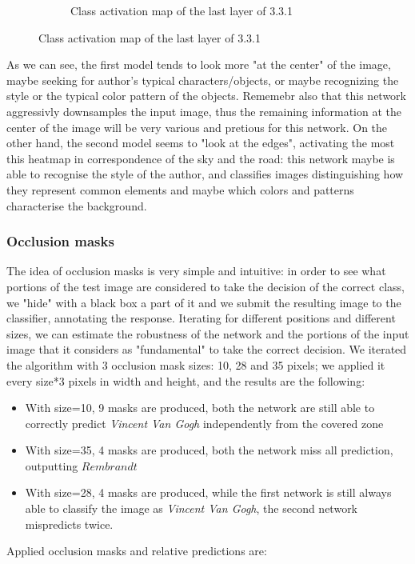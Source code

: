 \begin{figure}[H]
\begin{subfigure}{0.5\textwidth}
		\caption{Class activation map of the last layer of 3.3.1}
		\label{fig:il_heatmap}
	\end{subfigure}
\end{figure}

\noindent As we can see, the first model tends to look more "at the center" of the image, maybe seeking for author's typical characters/objects, or maybe recognizing the style or the typical color pattern of the objects. Rememebr also that this network aggressivly downsamples the input image, thus the remaining information at the center of the image will be very various and pretious for this network. On the other hand, the second model seems to "look at the edges", activating the most this heatmap in correspondence of the sky and the road: this network maybe is able to recognise the style of the author, and classifies images distinguishing how they represent common elements and maybe which colors and patterns characterise the background.

\subsubsection{Occlusion masks}
The idea of occlusion masks is very simple and intuitive: in order to see what portions of the test image are considered to take the decision of the correct class, we "hide" with a black box a part of it and we submit the resulting image to the classifier, annotating the response. Iterating for different positions and different sizes, we can estimate the robustness of the network and the portions of the input image that it considers as "fundamental" to take the correct decision.
We iterated the algorithm with 3 occlusion mask sizes: 10, 28 and 35 pixels; we applied it every size*3 pixels in width and height, and the results are the following:
\begin{itemize}
\item With size=10, 9 masks are produced, both the network are still able to correctly predict \textit{Vincent Van Gogh} independently from the covered zone
\item With size=35, 4 masks are produced, both the network miss all prediction, outputting $Rembrandt$
\item With size=28, 4 masks are produced, while the first network is still always able to classify the image as \textit{Vincent Van Gogh}, the second network mispredicts twice.
\end{itemize}

\noindent Applied occlusion masks and relative predictions are:

